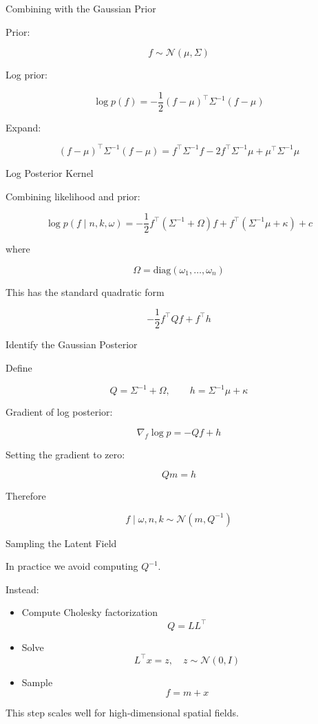 \documentclass[11pt]{beamer}
\begin{document}
\begin{frame}{Combining with the Gaussian Prior}

Prior:

\[
f \sim \mathcal{N}(\mu,\Sigma)
\]

Log prior:

\[
\log p(f)
=
-\frac12 (f-\mu)^\top
\Sigma^{-1}
(f-\mu)
\]

Expand:

\[
(f-\mu)^\top\Sigma^{-1}(f-\mu)
=
f^\top\Sigma^{-1}f
-2f^\top\Sigma^{-1}\mu
+
\mu^\top\Sigma^{-1}\mu
\]

\end{frame}

\begin{frame}{Log Posterior Kernel}

Combining likelihood and prior:

\[
\log p(f\mid n,k,\omega)
=
-\frac12 f^\top(\Sigma^{-1}+\Omega)f
+
f^\top(\Sigma^{-1}\mu+\kappa)
+
c
\]

where

\[
\Omega = \text{diag}(\omega_1,\dots,\omega_n)
\]

This has the standard quadratic form

\[
-\frac12 f^\top Q f + f^\top h
\]

\end{frame}

\begin{frame}{Identify the Gaussian Posterior}

Define

\[
Q = \Sigma^{-1}+\Omega,
\qquad
h = \Sigma^{-1}\mu+\kappa
\]

Gradient of log posterior:

\[
\nabla_f \log p
=
-Qf + h
\]

Setting the gradient to zero:

\[
Qm = h
\]

Therefore

\[
f \mid \omega,n,k
\sim
\mathcal{N}(m,Q^{-1})
\]

\end{frame}

\begin{frame}{Sampling the Latent Field}

In practice we avoid computing $Q^{-1}$.

Instead:

\begin{itemize}
\item Compute Cholesky factorization
\[
Q = LL^\top
\]

\item Solve
\[
L^\top x = z, \quad z\sim \mathcal{N}(0,I)
\]

\item Sample
\[
f = m + x
\]
\end{itemize}

This step scales well for high-dimensional
spatial fields.

\end{frame}
\end{document}

